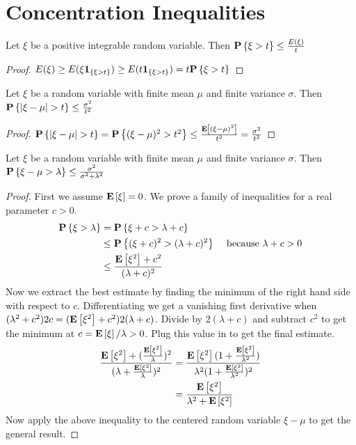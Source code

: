 \chapter{Concentration Inequalities}
\begin{lem}\label{MarkovInequality}Let $\xi$ be a positive integrable random variable.  Then $\textbf{P}\left \{\xi>t \right \} \leq \frac{E(\xi)}{t}$
\end{lem}
\begin{proof}
$E(\xi) \geq E(\xi\textbf{1}_{\{\xi>t\}}) \geq E(t\textbf{1}_{\{\xi>t\}})=t\textbf{P}\left \{\xi>t \right \}$
\end{proof}

\begin{lem}\label{ChebInequality}Let $\xi$ be a random variable with finite mean $\mu$ and finite variance $\sigma$.  Then $\probability{|\xi-\mu|>t} \leq \frac{\sigma^2}{t^2}$\end{lem}
\begin{proof}
$\probability{|\xi-\mu|>t} = \probability{(\xi-\mu)^2 > t^2} \leq \frac{\expectation{(\xi-\mu)^2}}{t^2}=\frac{\sigma^2}{t^2}$
\end{proof}

\begin{lem}\label{OneSidedChebInequality}Let $\xi$ be a random variable with finite mean $\mu$ and
  finite variance $\sigma$.  Then $\textbf{P}\left \{\xi-\mu>\lambda \right \} \leq
  \frac{\sigma^2}{\sigma^2 + \lambda^2}$
\end{lem}
\begin{proof}
First we assume $\textbf{E}\left[\xi\right]=0$.  We prove a family of
inequalities for a real parameter $c > 0$.
\begin{align*}
\textbf{P}\left \{\xi>\lambda \right \}  
&= \textbf{P}\left \{\xi + c > \lambda + c \right \} \\
& \leq \textbf{P}\left \{(\xi + c)^2 > (\lambda + c)^2 \right \} & \textrm{ because }
\lambda+c>0 \\
& \leq \frac{\textbf{E}\left[\xi^2\right] + c^2}{(\lambda + c)^2}
\end{align*}
Now we extract the best estimate by finding the minimum of the right
hand side with respect to $c$.  Differentiating we get a vanishing
first derivative when
$
(\lambda^2 + c^2) 2c = (\textbf{E}\left[\xi^2\right] + c^2) 2(\lambda +
c)$.  Divide by $2(\lambda+ c)$  and subtract $c^2$ to get the
  minimum at $c=\textbf{E}\left[\xi\right]/\lambda > 0$.  Plug this value in to
  get the final estimate.
\begin{align*}
\frac{
  \textbf{E}\left[\xi^2\right] +
  (\frac{\textbf{E}\left[\xi^2\right]}{\lambda})^2
}
{(\lambda +
    \frac{\textbf{E}\left[\xi^2\right]}{\lambda})^2
} & =
    \frac{\textbf{E}\left[\xi^2\right](1 +
      \frac{\textbf{E}\left[\xi^2\right]}{\lambda^2})}
{
  \lambda^2 (1 + \frac{\textbf{E}\left[\xi^2\right]}{\lambda^2}
)^2
} \\
& = \frac{\textbf{E}\left[\xi^2\right]}{\lambda^2 + \textbf{E}\left[\xi^2\right]}
\end{align*}
Now apply the above inequality to the centered random variable $\xi -
\mu$ to get the general result.
\qedhere
\end{proof}

